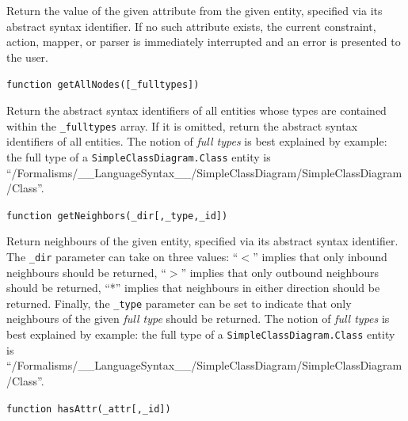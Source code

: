 \documentclass{article}
\numberwithin{equation}{section}
\numberwithin{figure}{section}
\begin{document}
Return the value of the given attribute from the given entity, specified via its abstract syntax identifier. If no such attribute exists, the current constraint, action, mapper, or parser is immediately interrupted and an error is presented to the user.\\
\vspace*{1em}


\begin{center}	{\large \texttt{function getAllNodes([\_fulltypes])}} \end{center}

Return the abstract syntax identifiers of all entities whose types are contained within the \texttt{\_fulltypes} array. If it is omitted, return the abstract syntax identifiers of all entities. The notion of \textit{full types} is best explained by example: the full type of a \texttt{SimpleClassDiagram.Class} entity is ``/Formalisms/\_\_LanguageSyn\-tax\_\_/SimpleClassDiagram/SimpleClassDiagram/Class''.\\
\vspace*{1em}


\begin{center}	{\large \texttt{function getNeighbors(\_dir[,\_type,\_id])}} \end{center}

Return neighbours of the given entity, specified via its abstract syntax identifier. The \texttt{\_dir} parameter can take on three values: ``$<$'' implies that only inbound neighbours should be returned, ``$>$'' implies that only outbound neighbours should be returned, ``*'' implies that neighbours in either direction should be returned. Finally, the \texttt{\_type} parameter can be set to indicate that only neighbours of the given \textit{full type} should be returned. The notion of \textit{full types} is best explained by example: the full type of a \texttt{SimpleClassDiagram.Class} entity is ``/Formalisms/\_\_LanguageSyntax\_\_/SimpleClassDiagram/SimpleClassDiagram/Class''.\\
\vspace*{1em}


\begin{center}	{\large \texttt{function hasAttr(\_attr[,\_id])}} \end{center}
\end{document}
